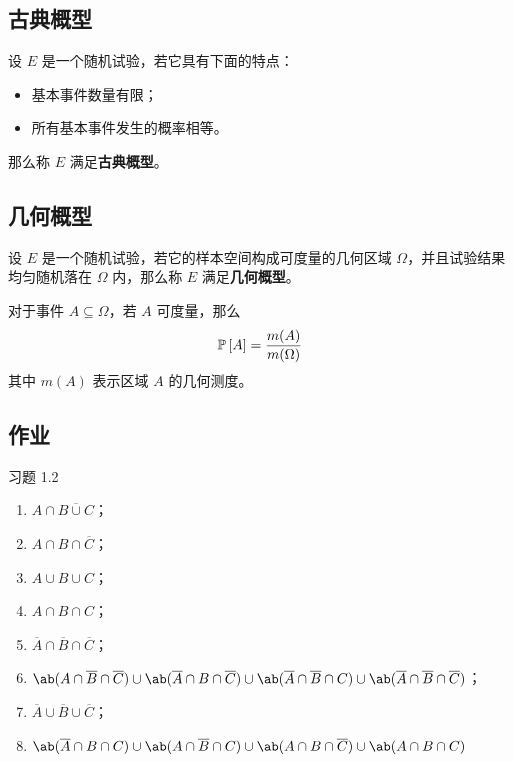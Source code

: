 \subsection{古典概型}

\begin{definition}[几何概型]
	设 $E$ 是一个随机试验，若它具有下面的特点：
	\begin{itemize}
		\item 基本事件数量有限；
		\item 所有基本事件发生的概率相等。
	\end{itemize}
	那么称 $E$ 满足\textbf{古典概型}。
\end{definition}

\subsection{几何概型}

\begin{definition}[几何概型]
	设 $E$ 是一个随机试验，若它的样本空间构成可度量的几何区域 $\Omega$，并且试验结果均匀随机落在 $\Omega$ 内，那么称 $E$ 满足\textbf{几何概型}。
\end{definition}

对于事件 $A \subseteq \Omega$，若 $A$ 可度量，那么
$$
\operatorname{\mathbb{P}}\left[A\right] = \frac{m(A)}{m(\Omega)}
$$
其中 $m(A)$ 表示区域 $A$ 的几何测度。

\subsection{作业}

\begin{problem}
	习题 1.2
	\begin{solution}
		\begin{enumerate}
			\item[\textbf{1)}] $A \cap \overline{B \cup C}$；
			\item[\textbf{2)}] $A \cap B \cap \overline{C}$；
			\item[\textbf{3)}] $A \cup B \cup C$；
			\item[\textbf{4)}] $A \cap B \cap C$；
			\item[\textbf{5)}] $\overline{A} \cap \overline{B} \cap \overline{C}$；
			\item[\textbf{6)}] $\ab(A \cap \overline{B} \cap \overline{C}) \cup \ab(\overline{A} \cap B \cap \overline{C}) \cup \ab(\overline{A} \cap \overline{B} \cap C) \cup \ab(\overline{A} \cap \overline{B} \cap \overline{C})$；
			\item[\textbf{7)}] $\overline{A} \cup \overline{B} \cup \overline{C}$；
			\item[\textbf{8)}] $\ab(\overline{A} \cap B \cap C) \cup \ab(A \cap \overline{B} \cap C) \cup \ab(A \cap B \cap \overline{C}) \cup \ab(A \cap B \cap C)$
		\end{enumerate}
	\end{solution}
\end{problem}

